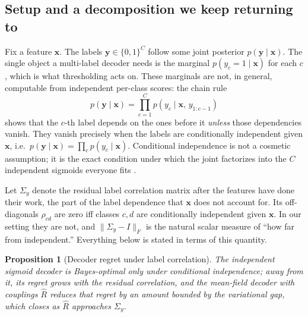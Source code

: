\documentclass[11pt,a4paper]{article}
\newtheorem{proposition}{Proposition}
\theoremstyle{definition}
\newcommand{\Rhat}{\widehat{R}}
\newcommand{\Sigmay}{\Sigma_{y}}
\begin{document}
\subsection{Setup and a decomposition we keep returning to}

Fix a feature $\mathbf{x}$. The labels $\mathbf{y}\in\{0,1\}^{C}$ follow some joint posterior $p(\mathbf{y}\mid\mathbf{x})$. The single object a multi-label decoder needs is the marginal $p(y_c{=}1\mid\mathbf{x})$ for each $c$, which is what thresholding acts on. These marginals are not, in general, computable from independent per-class scores: the chain rule
\begin{equation*}
p(\mathbf{y}\mid\mathbf{x})=\prod_{c=1}^{C}p\!\left(y_c\mid\mathbf{x},\,y_{1:c-1}\right)
\end{equation*}
shows that the $c$-th label depends on the ones before it \emph{unless} those dependencies vanish. They vanish precisely when the labels are conditionally independent given $\mathbf{x}$, i.e.\ $p(\mathbf{y}\mid\mathbf{x})=\prod_c p(y_c\mid\mathbf{x})$. Conditional independence is not a cosmetic assumption; it is the exact condition under which the joint factorizes into the $C$ independent sigmoids everyone fits \citep{dembczynski2012labeldependence}.

Let $\Sigmay$ denote the residual label correlation matrix after the features have done their work, the part of the label dependence that $\mathbf{x}$ does not account for. Its off-diagonals $\rho_{cd}$ are zero iff classes $c,d$ are conditionally independent given $\mathbf{x}$. In our setting they are not, and $\|\Sigmay-I\|_F$ is the natural scalar measure of ``how far from independent.'' Everything below is stated in terms of this quantity.

\begin{proposition}[Decoder regret under label correlation]
\label{prop:regret}
The independent sigmoid decoder is Bayes-optimal only under conditional independence; away from it, its regret grows with the residual correlation, and the mean-field decoder with couplings $\Rhat$ reduces that regret by an amount bounded by the variational gap, which closes as $\Rhat$ approaches $\Sigmay$.
\end{proposition}
\end{document}
